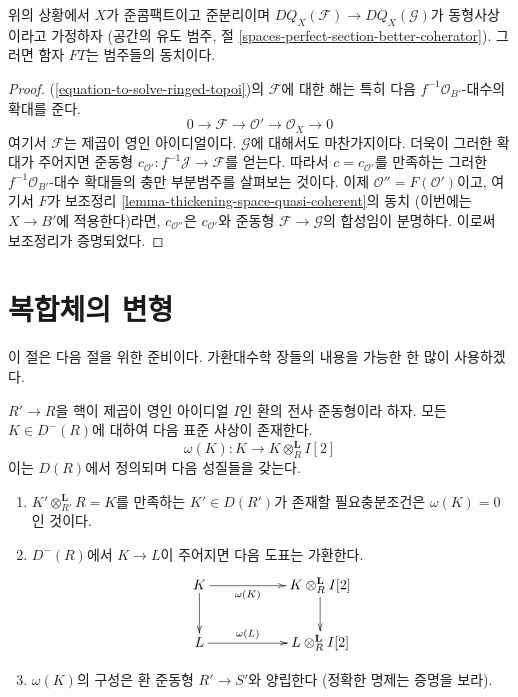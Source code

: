 \begin{lemma}
\label{lemma-thickening-over-thickening-space-quasi-coherent}
위의 상황에서 $X$가 준콤팩트이고 준분리이며
$DQ_X(\mathcal{F}) \to DQ_X(\mathcal{G})$가 동형사상이라고 가정하자
(공간의 유도 범주, 절
\ref{spaces-perfect-section-better-coherator}). 그러면 함자 $FT$는
범주들의 동치이다.
\end{lemma}

\begin{proof}
(\ref{equation-to-solve-ringed-topoi})의 $\mathcal{F}$에 대한 해는 특히
다음 $f^{-1}\mathcal{O}_{B'}$-대수의 확대를 준다.
$$
0 \to \mathcal{F} \to \mathcal{O}' \to \mathcal{O}_X \to 0
$$
여기서 $\mathcal{F}$는 제곱이 영인 아이디얼이다. $\mathcal{G}$에
대해서도 마찬가지이다. 더욱이 그러한 확대가 주어지면 준동형
$c_{\mathcal{O}'} : f^{-1}\mathcal{J} \to \mathcal{F}$를 얻는다.
따라서 $c = c_{\mathcal{O}'}$를 만족하는 그러한
$f^{-1}\mathcal{O}_{B'}$-대수 확대들의 충만 부분범주를 살펴보는
것이다. 이제 $\mathcal{O}'' = F(\mathcal{O}')$이고, 여기서 $F$가
보조정리 \ref{lemma-thickening-space-quasi-coherent}의 동치
(이번에는 $X \to B'$에 적용한다)라면, $c_{\mathcal{O}''}$은
$c_{\mathcal{O}'}$와 준동형 $\mathcal{F} \to \mathcal{G}$의 합성임이
분명하다. 이로써 보조정리가 증명되었다.
\end{proof}





\section{복합체의 변형}
\label{section-deformations-complexes}

\noindent
이 절은 다음 절을 위한 준비이다. 가환대수학 장들의 내용을 가능한 한
많이 사용하겠다.

\begin{lemma}
\label{lemma-canonical-class-algebra}
$R' \to R$을 핵이 제곱이 영인 아이디얼 $I$인 환의 전사 준동형이라
하자. 모든 $K \in D^-(R)$에 대하여 다음 표준 사상이 존재한다.
$$
\omega(K) : K \longrightarrow K \otimes_R^\mathbf{L} I[2]
$$
이는 $D(R)$에서 정의되며 다음 성질들을 갖는다.
\begin{enumerate}
\item $K' \otimes_{R'}^\mathbf{L} R = K$를 만족하는 $K' \in D(R')$가
존재할 필요충분조건은 $\omega(K) = 0$인 것이다.
\item $D^-(R)$에서 $K \to L$이 주어지면 다음 도표는 가환한다.
$$
\xymatrix{
K \ar[d] \ar[rr]_-{\omega(K)} & &
K \otimes^\mathbf{L}_R I[2] \ar[d] \\
L \ar[rr]^-{\omega(L)} & &
L \otimes^\mathbf{L}_R I[2]
}
$$
\item $\omega(K)$의 구성은 환 준동형 $R' \to S'$와 양립한다
(정확한 명제는 증명을 보라).
\end{enumerate}
\end{lemma}

